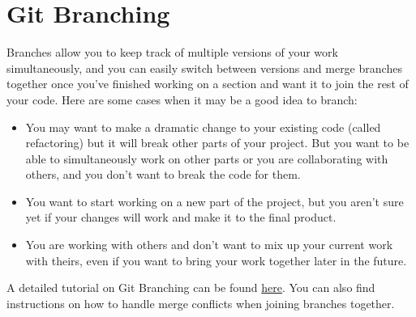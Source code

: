 \documentclass[]{book}
\providecommand{\tightlist}{%
  \setlength{\itemsep}{0pt}\setlength{\parskip}{0pt}}
\begin{document}
\hypertarget{git-branching}{%
\section{Git Branching}\label{git-branching}}

Branches allow you to keep track of multiple versions of your work simultaneously, and you can easily switch between versions and merge branches together once you've finished working on a section and want it to join the rest of your code. Here are some cases when it may be a good idea to branch:

\begin{itemize}
\tightlist
\item
  You may want to make a dramatic change to your existing code (called refactoring) but it will break other parts of your project. But you want to be able to simultaneously work on other parts or you are collaborating with others, and you don't want to break the code for them.
\item
  You want to start working on a new part of the project, but you aren't sure yet if your changes will work and make it to the final product.
\item
  You are working with others and don't want to mix up your current work with theirs, even if you want to bring your work together later in the future.
\end{itemize}

A detailed tutorial on Git Branching can be found \href{https://sp19.datastructur.es/materials/guides/using-git\#e-git-branching-advanced-git-optional}{here}. You can also find instructions on how to handle merge conflicts when joining branches together.
\end{document}
